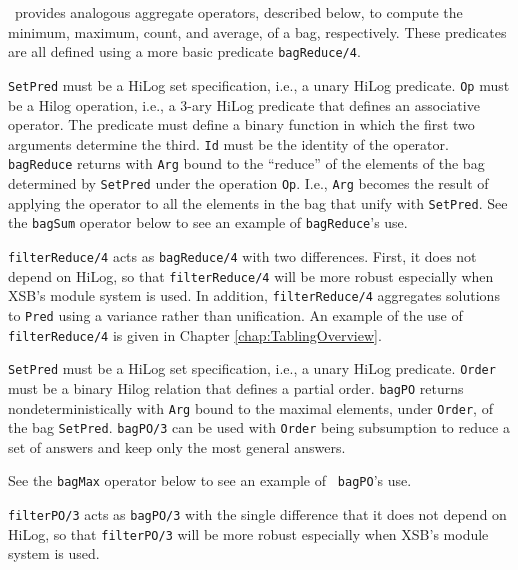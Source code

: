 \ourprolog\ provides analogous aggregate operators, described below, to
compute the minimum, maximum, count, and average, of a bag,
respectively.  These predicates are all defined using a more basic
predicate \verb|bagReduce/4|.

\begin{description}

{\tt SetPred} must be a HiLog set specification, i.e., a unary HiLog
predicate.  {\tt Op} must be a Hilog operation, i.e., a 3-ary HiLog
predicate that defines an associative operator.  The predicate must
define a binary function in which the first two arguments determine
the third.  {\tt Id} must be the identity of the operator.  {\tt
bagReduce} returns with {\tt Arg} bound to the ``reduce'' of the
elements of the bag determined by {\tt SetPred} under the operation
{\tt Op}.  I.e., {\tt Arg} becomes the result of applying the operator
to all the elements in the bag that unify with {\tt SetPred}.  See the
{\tt bagSum} operator below to see an example of {\tt bagReduce}'s
use.

{\tt filterReduce/4} acts as {\tt bagReduce/4} with two differences.
First, it does not depend on HiLog, so that {\tt filterReduce/4} will
be more robust especially when XSB's module system is used.  In
addition, {\tt filterReduce/4} aggregates solutions to {\tt Pred}
using a variance rather than unification.  An example of the use of
{\tt filterReduce/4} is given in Chapter \ref{chap:TablingOverview}.

    {\tt SetPred} must be a HiLog set specification, i.e., a unary
    HiLog predicate.  {\tt Order} must be a binary Hilog relation that
    defines a partial order.  {\tt bagPO} returns nondeterministically
    with {\tt Arg} bound to the maximal elements, under {\tt Order}, of
    the bag {\tt SetPred}.  {\tt bagPO/3} can be used with {\tt Order}
    being subsumption to reduce a set of answers and keep only the most
    general answers.

    See the {\tt bagMax} operator below to see an example of {\tt
    bagPO}'s use.

{\tt filterPO/3} acts as {\tt bagPO/3} with the single difference that
it does not depend on HiLog, so that {\tt filterPO/3} will be more
robust especially when XSB's module system is used.


\end{description}
